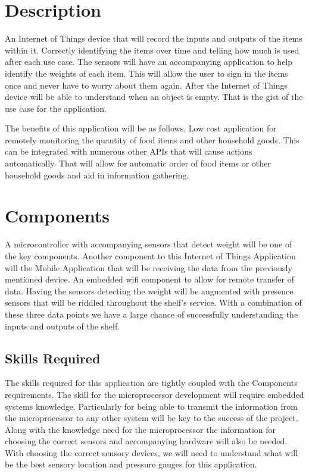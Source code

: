 \documentclass{article}
\begin{document}


\section{Description}

An Internet of Things device that will record the inputs and outputs of the items within it. 
Correctly identifying the items over time and telling how much is used after each use case.
The sensors will have an accompanying application to help identify the weights of each item.
This will allow the user to sign in the items once and never have to worry about them again.
After the Internet of Things device will be able to understand when an object is empty.
That is the gist of the use case for the application. 

The benefits of this application will be as follows. 
Low cost application for remotely monitoring the quantity of food items and other household goods.
This can be integrated with numerous other APIs that will cause actions automatically.
That will allow for automatic order of food items or other household goods and aid in information gathering. 

\section{Components}

A microcontroller with accompanying sensors that detect weight will be one of the key components. 
Another component to this Internet of Things Application will the Mobile Application that will be receiving the data from the previously mentioned device.
An embedded wifi component to allow for remote transfer of data. 
Having the sensors detecting the weight will be augmented with presence sensors that will be riddled throughout the shelf's service.
With a combination of these three data points we have a large chance of successfully understanding the inputs and outputs of the shelf.

\subsection{Skills Required}

The skills required for this application are tightly coupled with the Components requirements.
The skill for the microprocessor development will require embedded systems knowledge.
Particularly for being able to transmit the information from the microprocessor to any other system will be key to the success of the project.
Along with the knowledge need for the microprocessor the information for choosing the correct sensors and accompanying hardware will also be needed.
With choosing the correct sensory devices, we will need to understand what will be the best sensory location and pressure gauges for this application.
\end{document}
